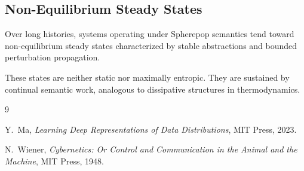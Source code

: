 \documentclass[11pt]{article}
\begin{document}
\subsection{Non-Equilibrium Steady States}

Over long histories, systems operating under Spherepop semantics tend
toward non-equilibrium steady states characterized by stable abstractions
and bounded perturbation propagation.

These states are neither static nor maximally entropic. They are sustained
by continual semantic work, analogous to dissipative structures in
thermodynamics.



\begin{thebibliography}{9}

Y.~Ma,
\emph{Learning Deep Representations of Data Distributions},
MIT Press, 2023.

N.~Wiener,
\emph{Cybernetics: Or Control and Communication in the Animal and the Machine},
MIT Press, 1948.

\end{thebibliography}
\end{document}
